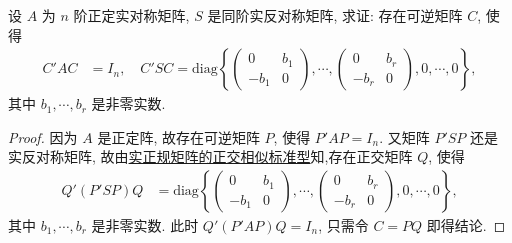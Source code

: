 \documentclass[../../main.tex]{subfiles}%
\begin{document}
\begin{proposition}[正定阵与实反称阵可同时合同对角化]\label{proposition:正定阵与实反称阵可同时合同对角化-例9.114}
设 $A$ 为 $n$ 阶正定实对称矩阵, $S$ 是同阶实反对称矩阵, 求证: 存在可逆矩阵 $C$, 使得
\begin{align*}
C'AC &= I_n,\quad C'SC = \mathrm{diag}\left\{\begin{pmatrix}0 & b_1\\ -b_1 & 0\end{pmatrix},\cdots,\begin{pmatrix}0 & b_r\\ -b_r & 0\end{pmatrix},0,\cdots,0\right\},
\end{align*}
其中 $b_1,\cdots,b_r$ 是非零实数.
\end{proposition}
\begin{proof}

因为 $A$ 是正定阵, 故存在可逆矩阵 $P$, 使得 $P'AP = I_n$. 又矩阵 $P'SP$ 还是实反对称矩阵, 故由\hyperref[theorem:实正规矩阵的正交相似标准型]{实正规矩阵的正交相似标准型}知,存在正交矩阵 $Q$, 使得
\begin{align*}
Q'(P'SP)Q &= \mathrm{diag}\left\{\begin{pmatrix}0 & b_1\\ -b_1 & 0\end{pmatrix},\cdots,\begin{pmatrix}0 & b_r\\ -b_r & 0\end{pmatrix},0,\cdots,0\right\},
\end{align*}
其中 $b_1,\cdots,b_r$ 是非零实数. 此时 $Q'(P'AP)Q = I_n$, 只需令 $C = PQ$ 即得结论.

\end{proof}
\end{document}
